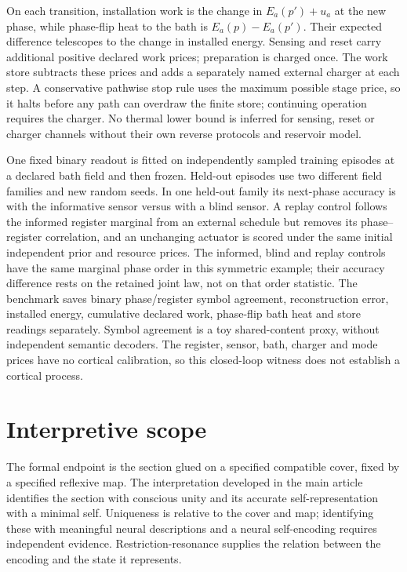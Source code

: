 \documentclass{article}
\begin{document}
On each transition, installation work is the change in $E_a(p')+u_a$ at the
new phase, while phase-flip heat to the bath is $E_a(p)-E_a(p')$. Their
expected difference telescopes to the change in installed energy. Sensing
and reset carry additional positive declared work prices; preparation is
charged once. The work store subtracts these prices and adds a separately
named external charger at each step. A conservative pathwise stop rule uses
the maximum possible stage price, so it halts before any path can overdraw
the finite store; continuing operation requires the charger. No thermal lower
bound is inferred for sensing, reset or charger channels without their own
reverse protocols and reservoir model.

One fixed binary readout is fitted on independently sampled training episodes
at a declared bath field and then frozen. Held-out episodes use two different
field families and new random seeds. In one held-out family its next-phase
accuracy is \gFeedbackInformedAccuracy{} with the informative sensor versus
\gFeedbackBlindAccuracy{} with a blind sensor. A replay control follows the
informed register marginal from an external schedule but removes its
phase--register correlation, and an unchanging actuator is scored under the
same initial independent prior and resource prices. The informed, blind and
replay controls have the same marginal phase order in this symmetric example;
their accuracy difference rests on the retained joint law, not on that order
statistic. The benchmark saves binary phase/register symbol agreement,
reconstruction error, installed energy, cumulative declared work, phase-flip
bath heat and store readings separately. Symbol agreement is a toy
shared-content proxy, without independent semantic decoders. The register,
sensor, bath, charger and mode prices have no cortical calibration, so this
closed-loop witness does not establish a cortical process.

\section{Interpretive scope}
\label{sec:supp-interpretive}

The formal endpoint is the section glued on a specified compatible cover, fixed by a specified reflexive map. The interpretation developed in the main article identifies the section with conscious unity and its accurate self-representation with a minimal self. Uniqueness is relative to the cover and map; identifying these with meaningful neural descriptions and a neural self-encoding requires independent evidence. Restriction-resonance supplies the relation between the encoding and the state it represents.
\end{document}
